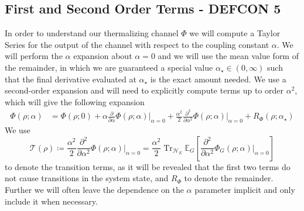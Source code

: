 \documentclass{article}
\DeclareMathOperator{\Tr}{Tr}
\newcommand{\hilb}{\mathcal{H}}
\begin{document}
\subsection{First and Second Order Terms - DEFCON 5}
In order to understand our thermalizing channel $\Phi$ we will compute a Taylor Series for the output of the channel with respect to the coupling constant $\alpha$. We will perform the $\alpha$ expansion about $\alpha = 0$ and we will use the mean value form of the remainder, in which we are guaranteed a special value $\alpha_{\star} \in (0, \infty)$ such that the final derivative evaluated at $\alpha_{\star}$ is the exact amount needed. We use a second-order expansion and will need to explicitly compute terms up to order $\alpha^2$, which will give the following expansion
\begin{align}
    \Phi(\rho; \alpha) &= \Phi(\rho; 0) + \alpha \frac{\partial}{\partial \alpha} \Phi(\rho; \alpha) \big|_{\alpha = 0} + \frac{\alpha^2}{2} \frac{\partial^2}{\partial \alpha^2} \Phi(\rho; \alpha) \big|_{\alpha = 0} + R_{\Phi}(\rho; \alpha_{\star}) \label{eq:phi_taylor_series}
\end{align}
We use
\begin{equation}
    \mathcal{T}(\rho) \coloneqq \frac{\alpha^2}{2} \frac{\partial^2}{\partial \alpha^2} \Phi(\rho; \alpha) \bigg|_{\alpha = 0} = \frac{\alpha^2}{2}  \Tr_{\hilb_E} \mathbb{E}_{G} \left[\frac{\partial^2}{\partial \alpha^2} \Phi_G(\rho; \alpha) \big|_{\alpha = 0}\right] \label{eq:transition_def}
\end{equation} to denote the transition terms, as it will be revealed that the first two terms do not cause transitions in the system state, and $R_{\Phi}$ to denote the remainder. 
Further we will often leave the dependence on the  $\alpha$ parameter implicit and only include it when necessary.
\end{document}
